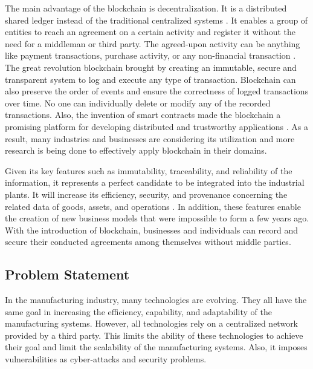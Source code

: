 \documentclass[runningheads]{llncs}
\begin{document}
\noindent The main  advantage of the blockchain is decentralization. It is a distributed shared ledger instead of the traditional centralized systems \cite{Zheng2017}. It enables a group of entities to reach an agreement on a certain activity and register it without the need for a middleman or third party. The agreed-upon activity can be anything like payment transactions, purchase activity, or any non-financial transaction \cite{Mohamed}. The great revolution blockchain brought by creating an immutable, secure and transparent system to log and execute any type of transaction. Blockchain can also preserve the order of events and ensure the correctness of logged transactions over time. No one can individually delete or modify any of the recorded transactions. Also, the invention of smart contracts made the blockchain a promising platform for developing distributed and trustworthy applications \cite{Mohamed}. As a result, many industries and businesses are considering its utilization and more research is being done to effectively apply blockchain in their domains.

\bigbreak

\noindent Given its key features such as immutability, traceability, and reliability of the information, it represents a perfect candidate to be integrated into the industrial plants. It will increase its efficiency, security, and provenance concerning the related data of goods, assets, and operations \cite{Internet2019}. In addition, these features enable the creation of new business models that were impossible to form a few years ago. With the introduction of blockchain, businesses and individuals can record and secure their conducted agreements among themselves without middle parties.


\subsection{Problem Statement}
In the manufacturing industry, many technologies are evolving. They all have the same goal in increasing the efficiency, capability, and adaptability of the manufacturing systems. However, all technologies rely on a centralized network provided by a third party. This limits the ability of these technologies to achieve their goal and limit the scalability of the manufacturing systems. Also, it imposes vulnerabilities as cyber-attacks and security problems.
\end{document}
